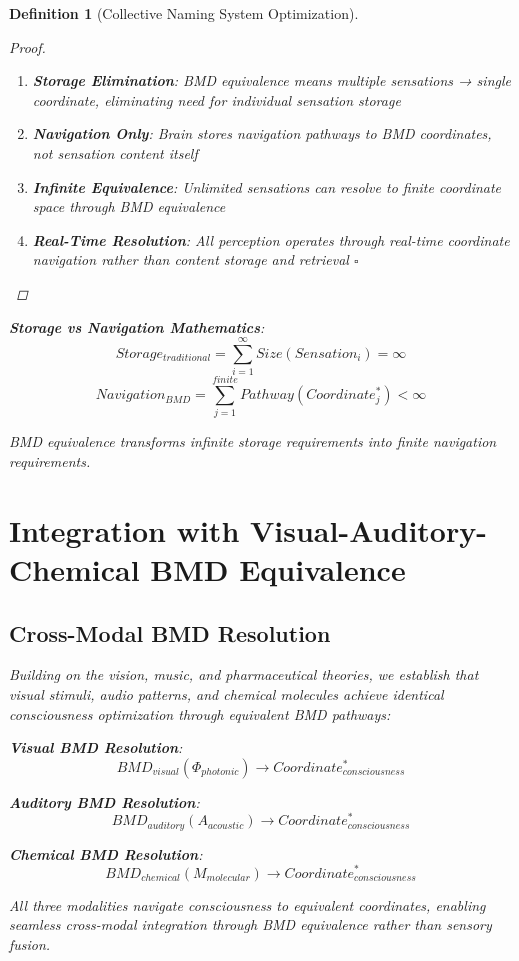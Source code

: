 \documentclass[12pt]{article}
\newtheorem{definition}{Definition}
\begin{document}
\begin{definition}[Collective Naming System Optimization]
\begin{proof}
\begin{enumerate}
\item \textbf{Storage Elimination}: BMD equivalence means multiple sensations → single coordinate, eliminating need for individual sensation storage
\item \textbf{Navigation Only}: Brain stores navigation pathways to BMD coordinates, not sensation content itself
\item \textbf{Infinite Equivalence}: Unlimited sensations can resolve to finite coordinate space through BMD equivalence
\item \textbf{Real-Time Resolution}: All perception operates through real-time coordinate navigation rather than content storage and retrieval $\square$
\end{enumerate}
\end{proof}

\textbf{Storage vs Navigation Mathematics}:
$$Storage_{traditional} = \sum_{i=1}^{\infty} Size(Sensation_i) = \infty$$
$$Navigation_{BMD} = \sum_{j=1}^{finite} Pathway(Coordinate_j^*) < \infty$$

BMD equivalence transforms infinite storage requirements into finite navigation requirements.

\section{Integration with Visual-Auditory-Chemical BMD Equivalence}

\subsection{Cross-Modal BMD Resolution}

Building on the vision, music, and pharmaceutical theories, we establish that visual stimuli, audio patterns, and chemical molecules achieve identical consciousness optimization through equivalent BMD pathways:

\textbf{Visual BMD Resolution}:
$$BMD_{visual}(\Phi_{photonic}) \rightarrow Coordinate_{consciousness}^*$$

\textbf{Auditory BMD Resolution}:
$$BMD_{auditory}(A_{acoustic}) \rightarrow Coordinate_{consciousness}^*$$

\textbf{Chemical BMD Resolution}:
$$BMD_{chemical}(M_{molecular}) \rightarrow Coordinate_{consciousness}^*$$

All three modalities navigate consciousness to equivalent coordinates, enabling seamless cross-modal integration through BMD equivalence rather than sensory fusion.


\end{definition}
\end{document}
